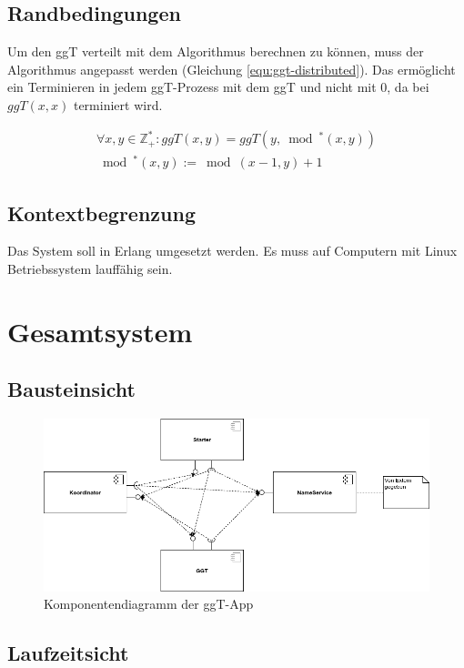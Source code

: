 \documentclass{article}
\begin{document}
\subsection{Randbedingungen}
Um den ggT verteilt mit dem Algorithmus berechnen zu können, muss der Algorithmus angepasst werden
(Gleichung \ref{equ:ggt-distributed}). Das ermöglicht ein Terminieren in jedem ggT-Prozess mit dem ggT und nicht mit 0,
da bei $ggT(x,x)$ terminiert wird.

\begin{multline}
\forall x,y \in \mathbb{Z}^{*}_{+}: ggT(x,y) = ggT(y,\bmod{^{*}(x,y)})\\
\bmod{^{*}(x,y)} := \bmod{(x-1, y)} + 1
\label{equ:ggt-distributed}
\end{multline}

\subsection{Kontextbegrenzung}
Das System soll in Erlang umgesetzt werden. Es muss auf Computern mit Linux Betriebssystem lauffähig sein.

\newpage

\section{Gesamtsystem}

\subsection{Bausteinsicht}
\begin{figure}[H]
    \centering
    \includegraphics[width=1.0\textwidth]{component-diagram.png}
    \caption[seq-dia]{Komponentendiagramm der ggT-App}
    \label{fig:component-diagram}
\end{figure}

\subsection{Laufzeitsicht}
\end{document}
